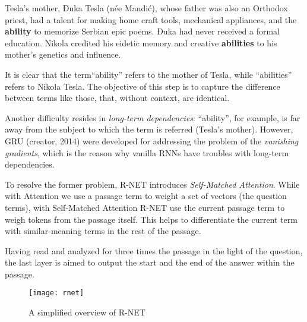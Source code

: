 \begin{enumerate}
  \begin{displayquote}
  Tesla’s mother, Đuka Tesla (née Mandić), whose father was also an Orthodox priest, had a talent for making home craft tools, mechanical appliances, and the \textbf{ability} to memorize Serbian epic poems. Đuka had never received a formal education. Nikola credited his eidetic memory and creative \textbf{abilities} to his mother’s genetics and influence.
  \end{displayquote}
  
  It is clear that the term``ability'' refers to the mother of Tesla, while ``abilities'' refers to Nikola Tesla. The objective of this step is to capture the difference between terms like those, that, without context, are identical.
  
  Another difficulty resides in \textit{long-term dependencies}: ``ability'', for example, is far away from the subject to which the term is referred (Tesla's mother). However, GRU (creator, 2014) were developed for addressing the problem of the \textit{vanishing gradients}, which is the reason why vanilla RNNs have troubles with long-term dependencies.
  
  To resolve the former problem, R-NET introduces \textit{Self-Matched Attention}. While with Attention we use a passage term to weight a set of vectors (the question terms), with Self-Matched Attention R-NET use the current passage term to weigh tokens from the passage itself. This helps to differentiate the current term with similar-meaning terms in the rest of the passage.
\end{enumerate}

Having read and analyzed for three times the passage in the light of the question, the last layer is aimed to output the start and the end of the answer within the passage.

\begin{figure}[t]
\centering
\texttt{[image: rnet]}
\caption{A simplified overview of R-NET \cite{imagernetoverview}}
\medskip
\end{figure}
